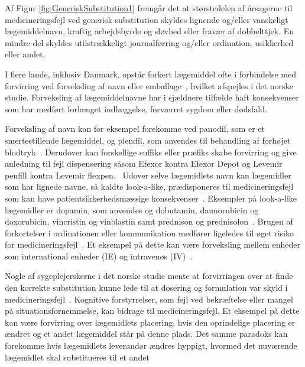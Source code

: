 Af Figur \ref{fig:GeneriskSubstitution1} fremgår det at størstedelen af årsagerne til medicineringsfejl ved generisk substitution skyldes lignende og/eller vanskeligt lægemiddelnavn, kraftig arbejdsbyrde og sløvhed eller fravær af dobbelttjek. En mindre del skyldes utilstrækkeligt journalførring og/eller ordination, usikkerhed eller andet. 

I flere lande, inklusiv Danmark, opstår forkert lægemiddel ofte i forbindelse med forvirring ved forveksling af navn eller emballage~\citep{DanskSelskabforPatientsikkerhed2009}, hvilket afspejles i det norske studie. Forveksling af lægemiddelnavne har i sjældnere tilfælde haft konsekvenser som har medført forlænget indlæggelse, forværret sygdom eller dødsfald.~\citep{DanskSelskabforPatientsikkerhed2009}

Forveksling af navn kan for eksempel forekomme ved panodil, som er et smertestillende lægemiddel, og plendil, som anvendes til behandling af forhøjet blodtryk~\citep{DanskSelskabforPatientsikkerhed2009}. Derudover kan forskellige suffiks eller præfiks skabe forvirring og give anledning til fejl dispensering såsom Efexor kontra Efexor Depot og Levemir penfill kontra Levemir flexpen.~\citep{DanskSelskabforPatientsikkerhed2009} Udover selve lægemidlets navn kan lægemidler som har lignede navne, så kaldte look-a-like, prædisponeres til medicineringsfejl som kan have patientsikkerhedsmæssige konsekvenser~\citep{Wittich2014}. Eksempler på look-a-like lægemidler er  dopamin, som anvendes  og dobutamin, daunorubicin og doxorubicin, vincristin og vinblastin samt prednison og prednisolon~\citep{Wittich2014}. Brugen af forkortelser i ordinationen eller kommunikation medfører ligeledes til øget risiko for medicineringsfejl~\citep{Wittich2014}. Et eksempel på dette kan være  forveksling mellem enheder som international enheder (IE) og intravenøs (IV)~\citep{Wittich2014}. 

Nogle af sygeplejerskerne i det norske studie mente at forvirringen over at finde den korrekte substitution kunne lede til at dosering og formulation var skyld i medicineringsfejl~\citep{Hakonsen2010}. Kognitive forstyrrelser, som fejl ved bekræftelse eller mangel på situationsfornemmelse, kan bidrage til medicineringsfejl. Et eksempel på dette kan være forvirring over lægemidlets placering, hvis den oprindelige placering er ændret og et andet lægemiddel står på denne plads. Det samme paradoks kan forekomme hvis lægemidlets leverandør ændres hyppigt, hvormed det nuværende lægemidlet skal substitueres til et andet~\citep{Wittich2014}

